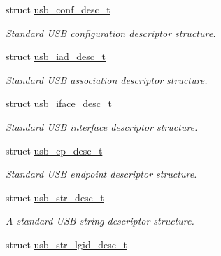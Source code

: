 \begin{DoxyCompactItemize}
struct \hyperlink{structusb__conf__desc__t}{usb\-\_\-conf\-\_\-desc\-\_\-t}
\begin{DoxyCompactList}\small\item\em Standard U\-S\-B configuration descriptor structure. \end{DoxyCompactList}\item 
struct \hyperlink{structusb__iad__desc__t}{usb\-\_\-iad\-\_\-desc\-\_\-t}
\begin{DoxyCompactList}\small\item\em Standard U\-S\-B association descriptor structure. \end{DoxyCompactList}\item 
struct \hyperlink{structusb__iface__desc__t}{usb\-\_\-iface\-\_\-desc\-\_\-t}
\begin{DoxyCompactList}\small\item\em Standard U\-S\-B interface descriptor structure. \end{DoxyCompactList}\item 
struct \hyperlink{structusb__ep__desc__t}{usb\-\_\-ep\-\_\-desc\-\_\-t}
\begin{DoxyCompactList}\small\item\em Standard U\-S\-B endpoint descriptor structure. \end{DoxyCompactList}\item 
struct \hyperlink{structusb__str__desc__t}{usb\-\_\-str\-\_\-desc\-\_\-t}
\begin{DoxyCompactList}\small\item\em A standard U\-S\-B string descriptor structure. \end{DoxyCompactList}\item 
struct \hyperlink{structusb__str__lgid__desc__t}{usb\-\_\-str\-\_\-lgid\-\_\-desc\-\_\-t}
\end{DoxyCompactItemize}

